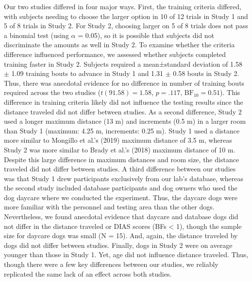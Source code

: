 \documentclass[
  pub,floatsintext]{apa6}
\begin{document}
Our two studies differed in four major ways. First, the training criteria differed, with subjects needing to choose the larger option in 10 of 12 trials in Study 1 and 5 of 8 trials in Study 2. For Study 2, choosing larger on 5 of 8 trials does not pass a binomial test (using \(\alpha\) = 0.05), so it is possible that subjects did not discriminate the amounts as well in Study 2. To examine whether the criteria difference influenced performance, we assessed whether subjects completed training faster in Study 2. Subjects required a mean±standard deviation of 1.58 \(\pm\) 1.09 training bouts to advance in Study 1 and 1.31 \(\pm\) 0.58 bouts in Study 2. Thus, there was anecdotal evidence for no difference in number of training bouts required across the two studies (\(t(91.58) = 1.58\), \(p = .117\), \(\mathrm{BF}_{\textrm{10}} = 0.51\)). This difference in training criteria likely did not influence the testing results since the distance traveled did not differ between studies. As a second difference, Study 2 used a longer maximum distance (13 m) and increments (0.5 m) in a larger room than Study 1 (maximum: 4.25 m, increments: 0.25 m). Study 1 used a distance more similar to Mongillo et al.'s (2019) maximum distance of 3.5 m, whereas Study 2 was more similar to Brady et al.'s (2018) maximum distance of 10 m. Despite this large difference in maximum distances and room size, the distance traveled did not differ between studies. A third difference between our studies was that Study 1 drew participants exclusively from our lab's database, whereas the second study included database participants and dog owners who used the dog daycare where we conducted the experiment. Thus, the daycare dogs were more familiar with the personnel and testing area than the other dogs. Nevertheless, we found anecdotal evidence that daycare and database dogs did not differ in the distance traveled or DIAS scores (BFs \textless{} 1), though the sample size for daycare dogs was small (N = 15). And, again, the distance traveled by dogs did not differ between studies. Finally, dogs in Study 2 were on average younger than those in Study 1. Yet, age did not influence distance traveled. Thus, though there were a few key differences between our studies, we reliably replicated the same lack of an effect across both studies.
\end{document}
